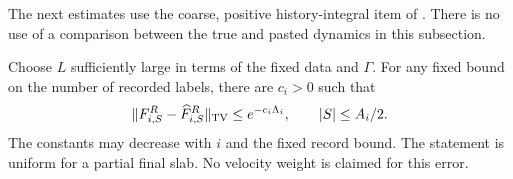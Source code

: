 The next estimates use the coarse, positive history-integral item of
.  There is no use of a comparison between the
true and pasted dynamics in this subsection.

\begin{lemma}\label{lem:stopped-variation}
Choose $L$ sufficiently large in terms of the fixed data and $\Gamma$.
For any fixed bound on the number of recorded labels, there are
$c_i>0$ such that
\begin{equation}\label{eq:retained-variation-error}
 \|F^R_{i,S}-\widehat F^R_{i,S}\|_{\mathrm{TV}}
                  \le e^{-c_i\Lambda_i},
 \qquad |S|\le A_i/2.
\end{equation}
The constants may decrease with $i$ and the fixed record bound.
The statement is uniform for a partial final slab.  No velocity weight
is claimed for this error.
\end{lemma}

